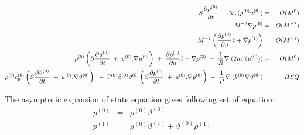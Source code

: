 \documentclass[11pt,a4paper]{article}
\begin{document}
\begin{eqnarray}
S\frac{\partial \rho^{(0)}}{\partial t}\hspace{1mm}+\hspace{1mm}\nabla.\hspace{0.5mm}(\rho^{(0)} u^{(0)}) &=& O(M^0) \\
M^{-2}\nabla p^{(0)} &=& O(M^{-2})\\
M^{-1}\left(\frac{\partial p^{(0)}}{\partial \eta}\hat{z}+\nabla p^{(1)}\right) &=& O(M^{-1})\\
\rho^{(0)} \left( S \frac{\partial u^{(0)}}{\partial t}\hspace{1mm}+\hspace{1mm}u^{(0)}.\nabla u^{(0)} \right)\hspace{1mm}+\hspace{1mm}\frac{\partial p^{(1)}}{\partial \eta}\hat{z}+\nabla p^{(2)}\hspace{1mm}-\hspace{1mm}\frac{1}{R}\nabla. (2\mu\varepsilon'(u^{(0)})) &=& O(M^0) \\
\rho^{(0)} c_p^{(0)} \left( S \frac{\partial \vartheta^{(0)}}{\partial t}\hspace{1mm}+\hspace{1mm}u^{(0)}.\nabla \vartheta^{(0)} \right)\hspace{1mm}\hspace{1mm}-\hspace{1mm}\Gamma^{(0)}\beta^{(0)}\vartheta^{(0)} \left( S \frac{\partial p^{(0)}}{\partial t}\hspace{1mm}+\hspace{1mm}u^{(0)}.\nabla p^{(0)} \right)\hspace{1mm}-\hspace{1mm}\frac{1}{P}\nabla.(k^{(0)}\nabla\vartheta^{(0)}) &=& HSQ \\
\end{eqnarray}

The asymptotic expansion of state equation gives following set of equation:
\begin{eqnarray}
p^{(0)}&=&\rho^{(0)}\vartheta^{(0)} \\
p^{(1)}&=&\rho^{(0)}\vartheta^{(1)}+\vartheta^{(0)}\rho^{(1)} \\
\end{eqnarray}
\end{document}
